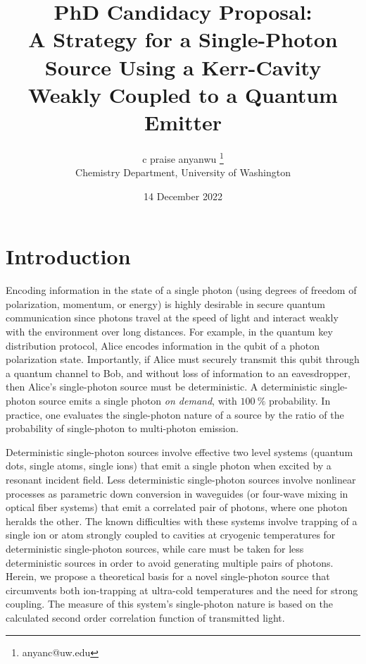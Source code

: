 \documentclass[12pt]{article}
\begin{document}
\title{PhD Candidacy Proposal: \\
A Strategy for a Single-Photon Source Using a Kerr-Cavity Weakly
Coupled to a Quantum Emitter}
\author{c praise anyanwu 
    \thanks{anyanc@uw.edu} \\
    Chemistry Department, University of Washington
}
\date{14 December 2022}
\maketitle

\newpage
\section{Introduction}
Encoding information in the state of a single photon (using degrees
of freedom of polarization, momentum, or energy) is highly desirable in 
secure quantum communication since photons travel at the speed of light and 
interact weakly with the environment over long distances.
\cite{gisin2002quantum, bennett2004quantum} For example, in the quantum key 
distribution protocol, Alice encodes information in the qubit of a photon 
polarization state. \cite{bennett1984proceedings, bennett1992quantum}
Importantly, if Alice must securely transmit this qubit through a quantum 
channel to Bob, and without loss of information to an eavesdropper, then 
Alice's single-photon source must be deterministic. A deterministic 
single-photon source emits a single photon \textit{on demand}, with $100 \: 
\%$ probability. In practice, one evaluates the single-photon nature of a 
source by the ratio of the probability of single-photon to multi-photon 
emission. \cite{lounis2005single, eisaman2011invited}

Deterministic single-photon sources involve effective two level systems 
(quantum dots, single atoms, single ions) \cite{ShieldsAndrewJ2007Sqls, 
strauf2007high, hennrich2004photon, wilk2007single, maurer2004single} 
that emit a single photon when excited by a resonant incident field. 
Less deterministic single-photon sources involve nonlinear processes as 
parametric down conversion in waveguides (or four-wave mixing in optical 
fiber systems) \cite{u2004efficient, sharping2001observation, 
goldschmidt2008spectrally} that emit a correlated pair of photons, where 
one photon heralds the other. The known difficulties with these systems 
involve trapping of a single ion or atom strongly coupled to cavities at 
cryogenic temperatures for deterministic single-photon sources, while 
care must be taken for less deterministic sources in order to avoid 
generating multiple pairs of photons. Herein, we propose a theoretical 
basis for a novel single-photon source that circumvents both 
ion-trapping at ultra-cold temperatures and the need for strong 
coupling. The measure of this system's single-photon nature is based on 
the calculated second order correlation function of transmitted light.
\end{document}
